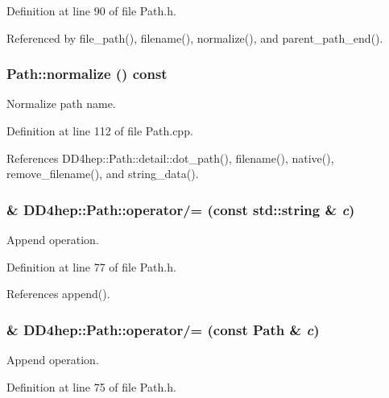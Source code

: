 Definition at line 90 of file Path.h.

Referenced by file\_\-path(), filename(), normalize(), and parent\_\-path\_\-end().\hypertarget{class_d_d4hep_1_1_path_a3e3d682aa7c70d1c644d67f9e26465e9}{
\subsubsection[{normalize}]{ Path::normalize () const}}
\label{class_d_d4hep_1_1_path_a3e3d682aa7c70d1c644d67f9e26465e9}


Normalize path name. 

Definition at line 112 of file Path.cpp.

References DD4hep::Path::detail::dot\_\-path(), filename(), native(), remove\_\-filename(), and string\_\-data().\hypertarget{class_d_d4hep_1_1_path_a523dd8b394e298b16ec54d602b85a87d}{
\subsubsection[{operator/=}]{\& DD4hep::Path::operator/= (const std::string \& {\em c})}}
\label{class_d_d4hep_1_1_path_a523dd8b394e298b16ec54d602b85a87d}


Append operation. 

Definition at line 77 of file Path.h.

References append().\hypertarget{class_d_d4hep_1_1_path_aeaa34e8637a1d259e32e28691f6baef6}{
\subsubsection[{operator/=}]{\& DD4hep::Path::operator/= (const {\bf Path} \& {\em c})}}
\label{class_d_d4hep_1_1_path_aeaa34e8637a1d259e32e28691f6baef6}


Append operation. 

Definition at line 75 of file Path.h.

